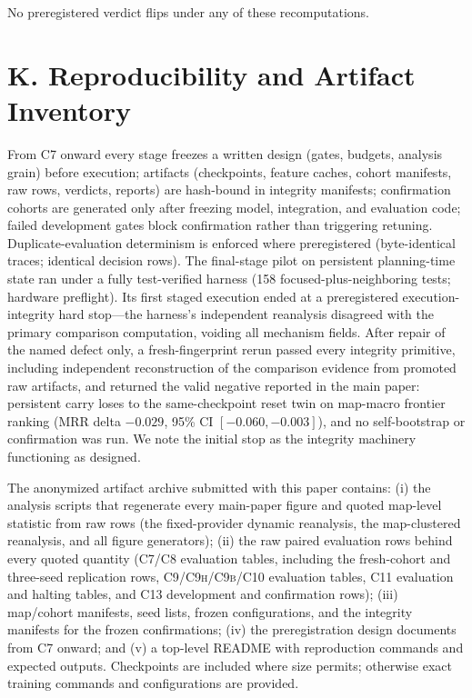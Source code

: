\documentclass[letterpaper]{article} %
\newcommand{\stage}[1]{\textsc{#1}}
\begin{document}
No preregistered verdict flips under any of these recomputations.

\section{K. Reproducibility and Artifact Inventory}

From \stage{C7} onward every stage freezes a written design (gates, budgets, analysis grain) before execution; artifacts (checkpoints, feature caches, cohort manifests, raw rows, verdicts, reports) are hash-bound in integrity manifests; confirmation cohorts are generated only after freezing model, integration, and evaluation code; failed development gates block confirmation rather than triggering retuning. Duplicate-evaluation determinism is enforced where preregistered (byte-identical traces; identical decision rows). The final-stage pilot on persistent planning-time state ran under a fully test-verified harness (158 focused-plus-neighboring tests; hardware preflight). Its first staged execution ended at a preregistered execution-integrity hard stop---the harness's independent reanalysis disagreed with the primary comparison computation, voiding all mechanism fields. After repair of the named defect only, a fresh-fingerprint rerun passed every integrity primitive, including independent reconstruction of the comparison evidence from promoted raw artifacts, and returned the valid negative reported in the main paper: persistent carry loses to the same-checkpoint reset twin on map-macro frontier ranking (MRR delta $-0.029$, 95\% CI $[-0.060,-0.003]$), and no self-bootstrap or confirmation was run. We note the initial stop as the integrity machinery functioning as designed.

The anonymized artifact archive submitted with this paper contains: (i) the analysis scripts that regenerate every main-paper figure and quoted map-level statistic from raw rows (the fixed-provider dynamic reanalysis, the map-clustered reanalysis, and all figure generators); (ii) the raw paired evaluation rows behind every quoted quantity (\stage{C7}/\stage{C8} evaluation tables, including the fresh-cohort and three-seed replication rows, \stage{C9}/\stage{C9h}/\stage{C9b}/\stage{C10} evaluation tables, \stage{C11} evaluation and halting tables, and \stage{C13} development and confirmation rows); (iii) map/cohort manifests, seed lists, frozen configurations, and the integrity manifests for the frozen confirmations; (iv) the preregistration design documents from \stage{C7} onward; and (v) a top-level README with reproduction commands and expected outputs. Checkpoints are included where size permits; otherwise exact training commands and configurations are provided.
\end{document}
